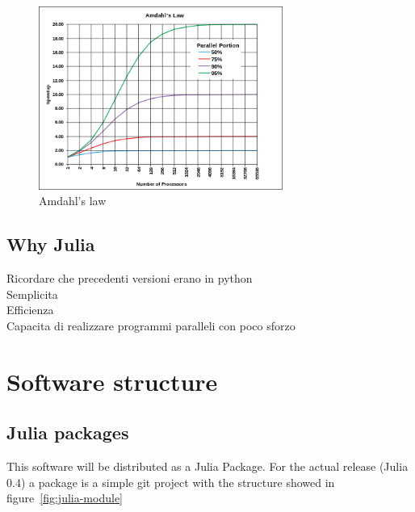 \documentclass[11pt,oneside]{article}	%
\begin{document}
\begin{figure}[htb]
  \begin{center}
    \includegraphics[width=8cm]{images/AmdahlsLaw.png}
  \end{center}
  \caption{Amdahl's law}
  \label{fig:Amdahl}
\end{figure}

\subsection{Why Julia}\label{sec:julia}
Ricordare che precedenti versioni erano in python\\
Semplicita\\
Efficienza\\
Capacita di realizzare programmi paralleli con poco sforzo\\


\section{Software structure}\label{sec:structure}

\subsection{Julia packages}\label{sec:juliaPkg}

This software will be distributed as a Julia Package. For the actual release (Julia 0.4) a package is a simple git project with the structure showed in figure~\ref{fig:julia-module}
\end{document}
